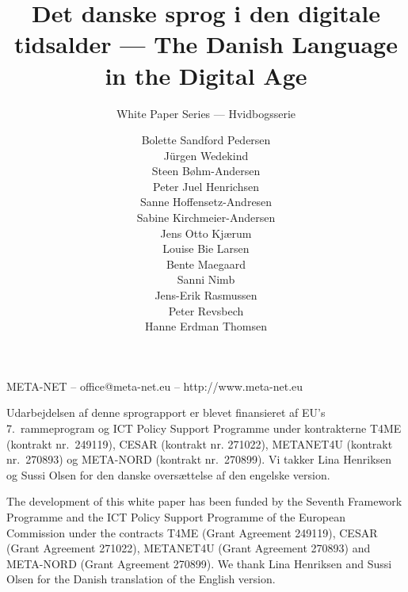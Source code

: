 \documentclass[]{../../metanetpaper}
\title{Det danske sprog i den digitale  tidsalder --- The Danish Language in the Digital Age}
\subtitle{White Paper Series --- Hvidbogsserie}
\author{
Bolette Sandford Pedersen  \\
 J\"{u}rgen Wedekind  \\
Steen B\o hm-Andersen \\
Peter Juel Henrichsen\\
Sanne Hoffensetz-Andresen\\
Sabine Kirchmeier-Andersen\\
Jens Otto Kj\ae rum\\
Louise Bie Larsen\\
Bente Maegaard\\
Sanni Nimb\\
Jens-Erik Rasmussen\\
Peter Revsbech\\
Hanne Erdman Thomsen}
\begin{document}
\renewcommand*{\figureformat}{\sffamily\thefigure\autodot}

\maketitle

\null
\pagestyle{empty} 

\centerline{META-NET -- office@meta-net.eu -- http://www.meta-net.eu}

\vfill

\begin{small}
 Udarbejdelsen af denne sprograpport er blevet finansieret af EU's 7.\ 
  rammeprogram og ICT Policy Support Programme under kontrakterne T4ME
  (kontrakt nr.\  249119), CESAR (kontrakt nr. 271022), METANET4U
  (kontrakt nr.\ 270893) og META-NORD
  (kontrakt nr.\  270899). Vi takker Lina Henriksen og Sussi Olsen for den danske overs\ae ttelse af den engelske version.
\end{small}

\bigskip
\begin{small}
  The development of this white paper has been funded by the Seventh
  Framework Programme and the ICT Policy Support Programme of the
  European Commission under the contracts T4ME (Grant Agreement 249119),
  CESAR (Grant Agreement 271022), METANET4U (Grant Agreement 270893)
  and META-NORD (Grant Agreement 270899). We thank Lina Henriksen and Sussi Olsen for the Danish translation of the English version.
\end{small}

\clearpage

\setcounter{page}{5}
\pagestyle{scrheadings}

\cleardoublepage


\end{document}
